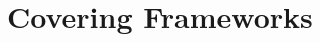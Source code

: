 \documentclass[11pt]{article}
\begin{document}








\section{Covering Frameworks}\label{sec:frameworks}
\end{document}
